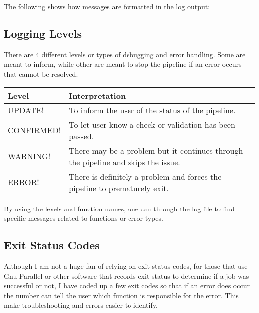 \documentclass[letterpaper,10pt,english]{sphinxmanual}
\let\sphinxpxdimen\pdfpxdimen\else\newdimen\sphinxpxdimen
\begin{document}
The following shows how messages are formatted in the log output:

\noindent\sphinxincludegraphics[width=800\sphinxpxdimen]{{messageFormat}.png}


\subsection{Logging Levels}
\label{\detokenize{parsingStdErrOut:logging-levels}}
There are 4 different levels or types of debugging and error handling.  Some are meant to inform, while other are meant to stop the pipeline if an error occurs that cannot be resolved.


\begin{savenotes}\sphinxattablestart
\centering
\begin{tabulary}{\linewidth}[t]{|T|T|}
\hline
\sphinxstyletheadfamily 
Level
&\sphinxstyletheadfamily 
Interpretation
\\
\hline
UPDATE!
&
To inform the user of the status of the pipeline.
\\
\hline
CONFIRMED!
&
To let user know a check or validation has been passed.
\\
\hline
WARNING!
&
There may be a problem but it continues through the pipeline and skips the issue.
\\
\hline
ERROR!
&
There is definitely a problem and forces the pipeline to prematurely exit.
\\
\hline
\end{tabulary}
\par
\sphinxattableend\end{savenotes}

By using the levels and function names, one can  through the log file to find specific messages related to functions or error types.


\subsection{Exit Status Codes}
\label{\detokenize{parsingStdErrOut:exit-status-codes}}
Although I am not a huge fan of relying on exit status codes, for those that use Gnu Parallel or other software that records exit status to determine if a job was successful or not, I have coded up a few exit codes so that if an error does occur the number can tell the user which function is responsible for the error.  This make troubleshooting and errors easier to identify.
\end{document}
